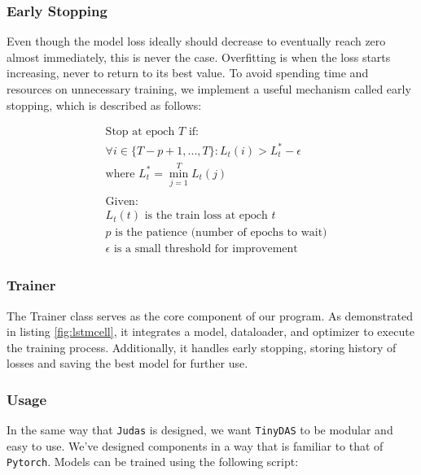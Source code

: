 

\subsubsection{Early Stopping}

Even though the model loss ideally should decrease to eventually reach zero almost immediately, this is never the case. Overfitting is when the loss starts increasing, never to return to its best value. To avoid spending time and resources on unnecessary training, we implement a useful mechanism called early stopping, which is described as follows:


\begin{align*}
&\text{Stop at epoch } T \text{ if:} \\
&\forall i \in \{T-p+1, ..., T\}: L_t(i) > L_t^* - \epsilon \\
&\text{where } L_t^* = \min_{j=1}^{T} L_t(j) \\
\\
&\text{Given:} \\
&L_t(t) \text{ is the train loss at epoch } t \\
&p \text{ is the patience (number of epochs to wait)} \\
&\epsilon \text{ is a small threshold for improvement}
\end{align*}

\subsubsection{Trainer}

The Trainer class serves as the core component of our program. As demonstrated in listing \ref{fig:lstmcell}, it integrates a model, dataloader, and optimizer to execute the training process. Additionally, it handles early stopping, storing history of losses and saving the best model for further use.




\subsubsection{Usage}

In the same way that \texttt{Judas} is designed, we want \texttt{TinyDAS} to be modular and easy to use. We've designed components in a way that is familiar to that of \texttt{Pytorch}. Models can be trained using the following script:

